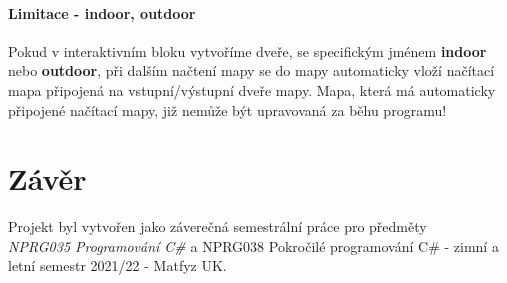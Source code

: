 \documentclass[a4paper, 12pt]{article}
\begin{document}
\paragraph{Limitace - indoor, outdoor}
Pokud v interaktivním bloku vytvoříme dveře, se specifickým jménem
\textbf{indoor} nebo \textbf{outdoor}, při dalším načtení mapy se do mapy
automaticky vloží načítací mapa připojená na vstupní/výstupní dveře mapy.
Mapa, která má automaticky připojené načítací mapy, již nemůže být upravovaná
za běhu programu!

\section{Závěr}
Projekt byl vytvořen jako záverečná semestrální práce pro předměty
\\\emph{NPRG035 Programování C\#} a {NPRG038 Pokročilé programování C\#} -
zimní a letní semestr 2021/22 - Matfyz UK.
\end{document}
